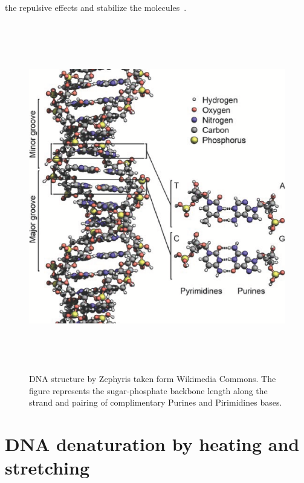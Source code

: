 \documentclass[12pt,masters,final]{UTRGVthesis}
\begin{document}
the repulsive effects and stabilize the molecules~\cite{sugimoto1996improved,ivanov2004statistical}.
%
\newpage
%
\begin{figure}[!h]
  \includegraphics[height=6in,width=1 \textwidth]{dna_structure.eps}
  \caption{\small DNA structure by Zephyris taken form Wikimedia Commons. The figure represents the sugar-phosphate backbone length along the strand and pairing of complimentary Purines and Pirimidines bases. }
  \label{fig:DNA structure}
\end{figure}
%
\newpage
\section{DNA denaturation by heating and stretching}
\end{document}
